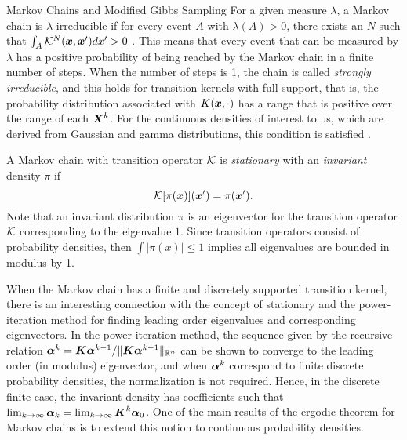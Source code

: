 \begin{chapter}{Markov Chains and Modified Gibbs Sampling}
For a given measure $\lambda$, a Markov chain is $\lambda$-irreducible if for every event $A$ with $\lambda(A) > 0$, there exists an $N$ such that $\int_A \mathcal K^N(\mbox{\boldmath$x$},\mbox{\boldmath$x$}')dx'>0$ \citep{robert2013monte}. 
This means that every event that can be measured by $\lambda$ has a positive probability of being reached by the Markov chain in a finite number of steps.
When the number of steps is 1, the chain is called \emph{strongly irreducible}, and this holds for transition kernels with full support, that is, the probability distribution associated with $K(\mbox{\boldmath$x$},\cdot)$ has a range that is positive over the range of each $\mbox{\boldmath$X$}^k$.
For the continuous densities of interest to us, which are derived from Gaussian and gamma distributions, 
this condition is satisfied \citep{liu2008monte}.

A Markov chain with transition operator $\mathcal K$ is \emph{stationary} with an \emph{invariant} density $\pi$ if 
\begin{equation} \label{eq:stationarity}
  \mathcal K [\pi(\mbox{\boldmath$x$})](\mbox{\boldmath$x$}') = \pi(\mbox{\boldmath$x$}').
\end{equation}
Note that an invariant distribution $\pi$ is an eigenvector for the transition operator $\mathcal K$ corresponding to the eigenvalue $1$.
Since transition operators consist of probability densities, then $\int |\pi(x)| \le 1$ implies all eigenvalues are bounded in modulus by 1.

When the Markov chain has a finite and discretely supported transition kernel, there is an interesting connection with the concept of stationary and the power-iteration method for finding leading order eigenvalues and corresponding eigenvectors.
In the power-iteration method, the sequence given by the recursive relation $\mbox{\boldmath$\alpha$}^k = \mbox{\boldmath$K$}\mbox{\boldmath$\alpha$}^{k-1}/\|\mbox{\boldmath$K$}\mbox{\boldmath$\alpha$}^{k-1}\|_{\mathbb R^n}$ can be shown to converge to the leading order (in modulus) eigenvector, and when $\mbox{\boldmath$\alpha$}^k$ correspond to finite discrete probability densities, the normalization is not required. 
Hence, in the discrete finite case, the invariant density has coefficients such that $\lim_{k\to \infty}\mbox{\boldmath$\alpha$}_k = \lim_{k\to \infty} \mbox{\boldmath$K$}^k \mbox{\boldmath$\alpha$}_0$.
One of the main results of the ergodic theorem for Markov chains is to extend this notion to continuous probability densities.


\end{chapter}

